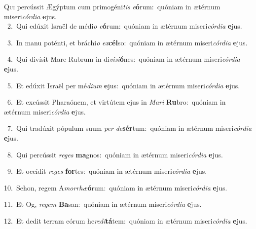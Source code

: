 \lettrine{\initial\textcolor{\initialcolor}{Q}}{ui} percússit Ægýptum cum primogéni\textit{tis} \textit{e}\-\textbf{ó}rum:~\star quóniam in ætérnum miseri\-\textit{cór}\-\textit{di}\textit{a} \textbf{e}\-jus.\\
{\numbfont\textcolor{\numbcolor}{~2.}}~Qui edúxit Israël de médi\textit{o} \textit{e}\-\textbf{ó}rum:~\star quóniam in ætérnum miseri\-\textit{cór}\-\textit{di}\textit{a} \textbf{e}\-jus.\par
{\numbfont\textcolor{\numbcolor}{~3.}}~In manu poténti, et bráchi\textit{o} \textit{ex}\-\textbf{cél}so:~\star quóniam in ætérnum miseri\-\textit{cór}\-\textit{di}\textit{a} \textbf{e}\-jus.\par
{\numbfont\textcolor{\numbcolor}{~4.}}~Qui divísit Mare Rubrum in di\-\textit{vi}\-\textit{si}\textbf{ó}nes:~\star quóniam in ætérnum miseri\-\textit{cór}\-\textit{di}\textit{a} \textbf{e}\-jus.\par
{\numbfont\textcolor{\numbcolor}{~5.}}~Et edúxit Israël per mé\-\textit{di}\-\textit{um} \textbf{e}\-jus:~\star quóniam in ætérnum miseri\-\textit{cór}\-\textit{di}\textit{a} \textbf{e}\-jus.\par
{\numbfont\textcolor{\numbcolor}{~6.}}~Et excússit Pharaónem, et virtútem ejus in \textit{Ma}\-\textit{ri} \textbf{Ru}\-bro:~\star quóniam in ætérnum miseri\-\textit{cór}\-\textit{di}\textit{a} \textbf{e}\-jus.\par
{\numbfont\textcolor{\numbcolor}{~7.}}~Qui tradúxit pópulum suum \textit{per} \textit{de}\-\textbf{sér}tum:~\star quóniam in ætérnum miseri\-\textit{cór}\-\textit{di}\textit{a} \textbf{e}\-jus.\par
{\numbfont\textcolor{\numbcolor}{~8.}}~Qui percússit \textit{re}\-\textit{ges} \textbf{ma}\-gnos:~\star quóniam in ætérnum miseri\-\textit{cór}\-\textit{di}\textit{a} \textbf{e}\-jus.\par
{\numbfont\textcolor{\numbcolor}{~9.}}~Et occídit \textit{re}\-\textit{ges} \textbf{for}\-tes:~\star quóniam in ætérnum miseri\-\textit{cór}\-\textit{di}\textit{a} \textbf{e}\-jus.\par
{\numbfont\textcolor{\numbcolor}{10.}}~Sehon, regem A\-\textit{mor}\-\textit{rhæ}\textbf{ó}rum:~\star quóniam in ætérnum miseri\-\textit{cór}\-\textit{di}\textit{a} \textbf{e}\-jus.\par
{\numbfont\textcolor{\numbcolor}{11.}}~Et Og, \textit{re}\-\textit{gem} \textbf{Ba}\-san:~\star quóniam in ætérnum miseri\-\textit{cór}\-\textit{di}\textit{a} \textbf{e}\-jus.\par
{\numbfont\textcolor{\numbcolor}{12.}}~Et dedit terram eórum he\-\textit{re}\-\textit{di}\textbf{tá}tem:~\star quóniam in ætérnum miseri\-\textit{cór}\-\textit{di}\textit{a} \textbf{e}\-jus.\par
